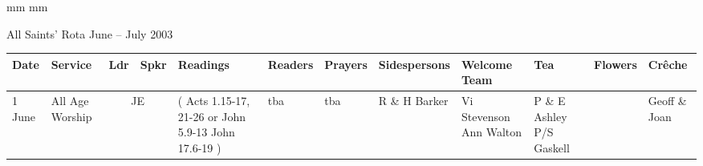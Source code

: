 \documentclass[10pt,a4paper]{article}
\newif\ifpdf
\begin{document}
\ifx\pdfoutput\undefined
\else
{} mm %
 mm
\fi
\begingroup
\ifpdf
\else
{}
\fi
\endgroup
\thispagestyle{empty}
\begin{center}
{\Large 
All Saints' Rota June -- July 2003}%
\vspace{1em}
{ \small
\begin{tabular}{|p{1.6cm}|p{1.4cm}|p{1.0cm}|p{0.8cm}|p{3.2cm}|p{2cm}|p{1.5cm}|p{2cm}|p{1.8cm}|p{1.9cm}
|p{2cm}|p{1.6cm}|}\hline
Date & Service
& Ldr & Spkr & Readings & Readers & Prayers &
Sidespersons & Welcome Team & Tea & Flowers & Cr\^{e}che \\ %
\hline\hline
1 June   &  All Age Worship &   \multicolumn{2}{|c|}{ JE }  &   
{\footnotesize (
Acts 1.15-17, 21-26 or
\linebreak 1 John 5.9-13
\linebreak John 17.6-19
) }
& 
tba & tba &
R \& H Barker  & Vi Stevenson Ann Walton & 
P \& E Ashley P/S Gaskell
&   &  Geoff \& Joan \\ \hline %


\end{tabular}}
\end{center}
\end{document}
